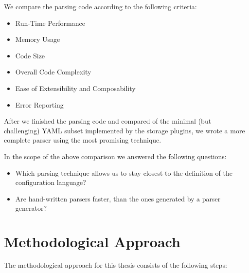 We compare the parsing code according to the following criteria:

\begin{itemize}
  \item Run-Time Performance
  \item Memory Usage
  \item Code Size
  \item Overall Code Complexity
  \item Ease of Extensibility and Composability
  \item Error Reporting
\end{itemize}

After we finished the parsing code and compared of the minimal (but challenging) YAML subset implemented by the storage plugins, we wrote a more complete  parser using the most promising technique.

In the scope of the above comparison we answered the following questions:

\begin{itemize}[label=❓]

  \item Which parsing technique allows us to stay closest to the definition of the configuration language?

  \item Are hand-written parsers faster, than the ones generated by a parser generator?

\end{itemize}

\section{Methodological Approach}

The methodological approach for this thesis consists of the following steps:

